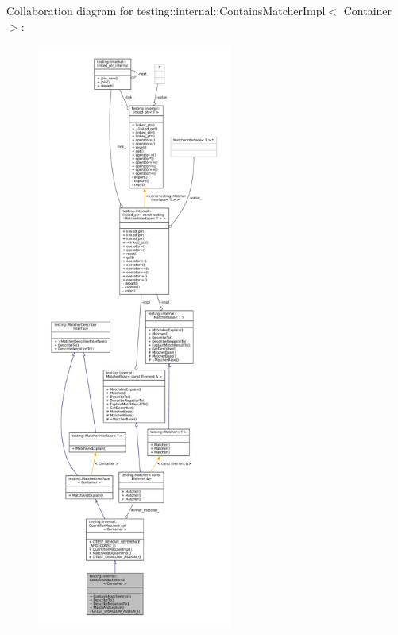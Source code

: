 Collaboration diagram for testing\+:\+:internal\+:\+:Contains\+Matcher\+Impl$<$ Container $>$\+:
\nopagebreak
\begin{figure}[H]
\begin{center}
\leavevmode
\includegraphics[height=550pt]{classtesting_1_1internal_1_1ContainsMatcherImpl__coll__graph}
\end{center}
\end{figure}
